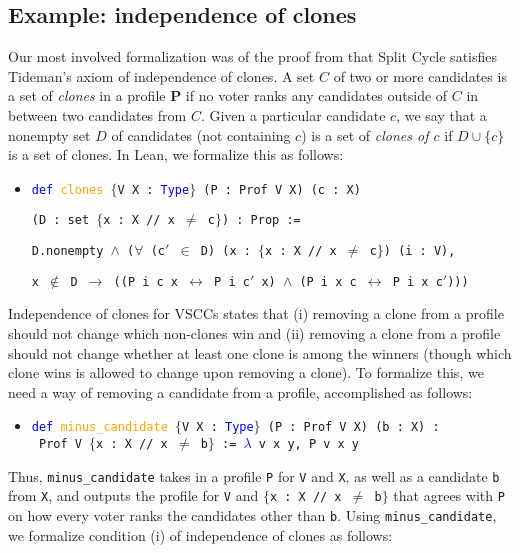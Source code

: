 \documentclass[runningheads]{llncs}
\begin{document}
\subsection{Example: independence of clones}\label{ClonesSection}

Our most involved formalization was of the proof from \cite{HP2020b} that Split Cycle satisfies Tideman's \cite{Tideman1987} axiom of independence of clones. A set $C$ of two or more candidates is a set of \textit{clones} in a profile $\mathbf{P}$ if no voter ranks any candidates outside of $C$ in between two candidates from $C$. Given a particular candidate $c$, we say that a nonempty set $D$ of candidates (not containing $c$) is a set of \textit{clones of $c$} if $D\cup \{c\}$ is a set of clones. In Lean, we formalize this as follows:

\begin{itemize}
\item[] \texttt{\textcolor{blue}{def} \textcolor{orange}{clones} $\{$V X : \textcolor{blue}{Type}$\}$ (P : Prof V X) (c : X)}

\texttt{(D : set $\{$x : X // x $\neq$ c$\}$) : Prop := }

\texttt{D.nonempty $\wedge$ ($\forall$ (c$'$ $\in$ D) (x : $\{$x : X // x $\neq$ c$\}$) (i : V),}

\texttt{x $\not\in$ D $\to$ ((P i c x $\leftrightarrow$ P i c$'$ x) $\wedge$ (P i x c $\leftrightarrow$ P i x c$'$)))}
\end{itemize}
Independence of clones for VSCCs states that (i) removing a clone from a profile should not change which non-clones win and (ii) removing a clone from a profile should not change whether at least one clone is among the winners (though which clone wins is allowed to change upon removing a clone). To formalize this, we need a way of removing a candidate from a profile, accomplished as follows:
\begin{itemize}
\item[] \texttt{\textcolor{blue}{def} \textcolor{orange}{minus\_candidate} $\{$V X : \textcolor{blue}{Type}$\}$ (P : Prof V X) (b : X) :} \\
\texttt{ Prof V $\{$x : X // x $\neq$ b$\}$ := \textcolor{blue}{$\lambda$} v x y, P v x y}
\end{itemize}
Thus, \texttt{minus\_candidate} takes in a profile \texttt{P} for \texttt{V} and \texttt{X}, as well as a candidate \texttt{b} from \texttt{X}, and outputs the profile for \texttt{V} and \texttt{$\{$x : X // x $\neq$ b$\}$} that agrees with \texttt{P} on how every voter ranks the candidates other than \texttt{b}. Using \texttt{minus\_candidate}, we formalize condition (i) of independence of clones as follows:
\end{document}
